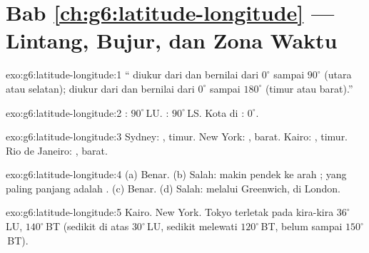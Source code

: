 \section*{Bab \ref{ch:g6:latitude-longitude} --- Lintang, Bujur, dan Zona Waktu}

\begin{solution}{exo:g6:latitude-longitude:1}
`` diukur dari  dan bernilai dari $0^\circ$ sampai
$90^\circ$ (utara atau selatan);  diukur dari  dan
bernilai dari $0^\circ$ sampai $180^\circ$ (timur atau barat).''
\end{solution}

\begin{solution}{exo:g6:latitude-longitude:2}
: $90^\circ$\,LU. : $90^\circ$\,LS. Kota di
: $0^\circ$.
\end{solution}

\begin{solution}{exo:g6:latitude-longitude:3}
Sydney: , timur. New York: , barat.
Kairo: , timur. Rio de Janeiro: ,
barat.
\end{solution}

\begin{solution}{exo:g6:latitude-longitude:4}
(a) Benar. (b) Salah:  makin pendek ke arah ; yang paling
panjang adalah . (c) Benar. (d) Salah:  melalui
Greenwich, di London.
\end{solution}

\begin{solution}{exo:g6:latitude-longitude:5}
Kairo. New York. Tokyo terletak pada kira-kira $36^\circ$\,LU,
$140^\circ$\,BT (sedikit di atas  $30^\circ$\,LU, sedikit melewati
 $120^\circ$\,BT, belum sampai $150^\circ$\,BT).
\end{solution}

